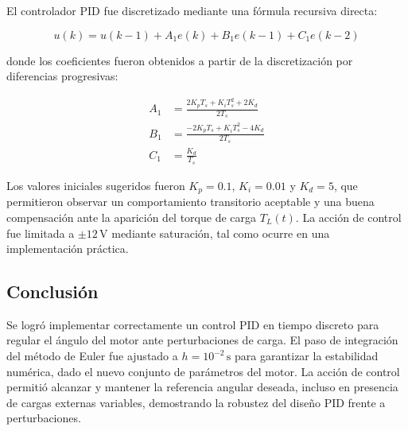 \documentclass{article}
\begin{document}
El controlador PID fue discretizado mediante una fórmula recursiva directa:

\begin{equation*}
    u(k) = u(k-1) + A_1 e(k) + B_1 e(k-1) + C_1 e(k-2)
\end{equation*}

donde los coeficientes fueron obtenidos a partir de la discretización por diferencias progresivas:

\begin{align*}
    A_1 &= \frac{2K_p T_s + K_i T_s^2 + 2K_d}{2T_s} \\
    B_1 &= \frac{-2K_p T_s + K_i T_s^2 - 4K_d}{2T_s} \\
    C_1 &= \frac{K_d}{T_s}
\end{align*}

\noindent Los valores iniciales sugeridos fueron \(K_p = 0.1\), \(K_i = 0.01\) y \(K_d = 5\), que permitieron observar un comportamiento transitorio aceptable y una buena compensación ante la aparición del torque de carga \(T_L(t)\). La acción de control fue limitada a \(\pm12\,\text{V}\) mediante saturación, tal como ocurre en una implementación práctica.

\subsection*{Conclusión}

Se logró implementar correctamente un control PID en tiempo discreto para regular el ángulo del motor ante perturbaciones de carga. El paso de integración del método de Euler fue ajustado a \(h = 10^{-2}\,\text{s}\) para garantizar la estabilidad numérica, dado el nuevo conjunto de parámetros del motor. La acción de control permitió alcanzar y mantener la referencia angular deseada, incluso en presencia de cargas externas variables, demostrando la robustez del diseño PID frente a perturbaciones.
\end{document}
